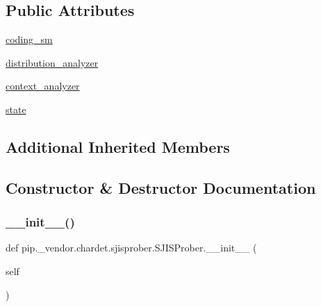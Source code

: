 \subsection*{Public Attributes}
\begin{DoxyCompactItemize}
\item 
\hyperlink{classpip_1_1__vendor_1_1chardet_1_1sjisprober_1_1SJISProber_a3b226f5616ecf2639bd0e43ef2cdcc20}{coding\+\_\+sm}
\item 
\hyperlink{classpip_1_1__vendor_1_1chardet_1_1sjisprober_1_1SJISProber_a177224cf3eed161834ea492bb091cca8}{distribution\+\_\+analyzer}
\item 
\hyperlink{classpip_1_1__vendor_1_1chardet_1_1sjisprober_1_1SJISProber_a5bb9a2dfdc55afc568ede9c4e3fb2522}{context\+\_\+analyzer}
\item 
\hyperlink{classpip_1_1__vendor_1_1chardet_1_1sjisprober_1_1SJISProber_a77f5cad65f5976df790b72b749ca97fc}{state}
\end{DoxyCompactItemize}
\subsection*{Additional Inherited Members}


\subsection{Constructor \& Destructor Documentation}
\mbox{\label{classpip_1_1__vendor_1_1chardet_1_1sjisprober_1_1SJISProber_acda929b60de9d576beae347c88751221}} 
\subsubsection{\texorpdfstring{\+\_\+\+\_\+init\+\_\+\+\_\+()}{\_\_init\_\_()}}
{\footnotesize\ttfamily def pip.\+\_\+vendor.\+chardet.\+sjisprober.\+S\+J\+I\+S\+Prober.\+\_\+\+\_\+init\+\_\+\+\_\+ (\begin{DoxyParamCaption}\item[{}]{self }\end{DoxyParamCaption})}



